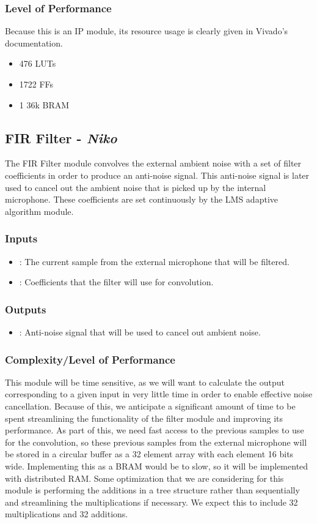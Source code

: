 \documentclass{fpgairpods}
\begin{document}
\begin{multicols*}{2}
\subsubsection{Level of Performance}
Because this is an IP module, its resource usage is clearly given in Vivado's documentation.
\begin{itemize}
    \item 476 LUTs
    \item 1722 FFs
    \item 1 36k BRAM
\end{itemize}

\subsection{FIR Filter - \textit{Niko}}
The FIR Filter module convolves the external ambient noise with a set of filter coefficients in order to produce an anti-noise signal. This anti-noise signal is later used to cancel out the ambient noise that is picked up by the internal microphone. These coefficients are set continuously by the LMS adaptive algorithm module.
\subsubsection{Inputs}
\begin{itemize}
    \item {}: The current sample from the external microphone that will be filtered.
    \item {}: Coefficients that the filter will use for convolution.
\end{itemize}
\subsubsection{Outputs}
\begin{itemize}
    \item {}: Anti-noise signal that will be used to cancel out ambient noise.
\end{itemize}
\subsubsection{Complexity/Level of Performance}
This module will be time sensitive, as we will want to calculate the output corresponding to a given input in very little time in order to enable effective noise cancellation. Because of this, we anticipate a significant amount of time to be spent streamlining the functionality of the filter module and improving its performance. As part of this, we need fast access to the previous samples to use for the convolution, so these previous samples from the external microphone will be stored in a circular buffer as a 32 element array with each element 16 bits wide. Implementing this as a BRAM would be to slow, so it will be implemented with distributed RAM. Some optimization that we are considering for this module is performing the additions in a tree structure rather than sequentially and streamlining the multiplications if necessary. We expect this to include 32 multiplications and 32 additions.


\end{multicols*}
\end{document}
